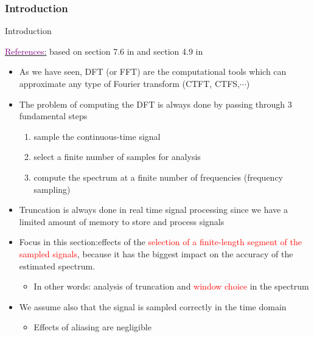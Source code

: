 \subsubsection{Introduction}
\begin{frame}[t,allowframebreaks]{Introduction}

\underline{\textcolor{purple}{References}:} based on section 7.6 in \cite{DSP_DimitrisManolakis} and section 4.9 in \cite{signal_processing_Lathi}

\begin{itemize}

\item As we have seen, DFT (or FFT) are the computational tools which can approximate any type of Fourier transform (CTFT, CTFS,$\cdots$)

\item The problem of computing the DFT is always done by passing through 3 fundamental steps

	\begin{enumerate}
	\item sample the continuous-time signal
	
	\item select a finite number of samples for analysis
	
	\item compute the spectrum at a finite
number of frequencies (frequency sampling)
	\end{enumerate}


\item Truncation is always done in real time signal processing since we have a limited amount of memory to store and process signals

\newpage
\item Focus in this section:effects of the \textcolor{red}{selection of a finite-length segment of the sampled signals}, because it
has the biggest impact on the accuracy of the estimated spectrum.

	\begin{itemize}
	\item In other words:  analysis of truncation and \textcolor{red}{window choice} in the spectrum
	\end{itemize}


\item We assume also that the signal is sampled correctly in the time domain
	\begin{itemize}
	\item Effects of aliasing are negligible 
	\end{itemize}

\end{itemize}

\end{frame}

